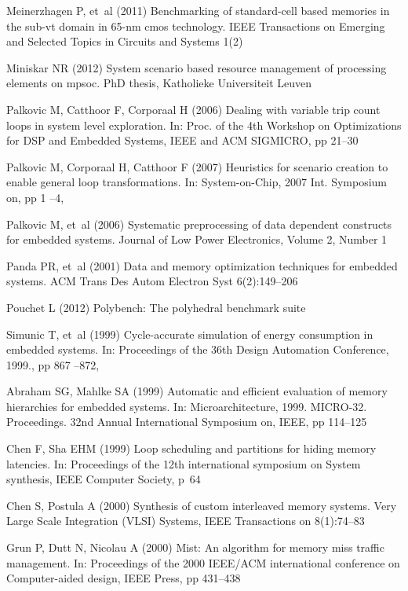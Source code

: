 \documentclass[smallcondensed]{svjour3}
\begin{document}
\begin{thebibliography}{40}
Meinerzhagen P, et~al (2011) Benchmarking of standard-cell based memories in
  the sub-vt domain in 65-nm cmos technology. IEEE Transactions on Emerging and
  Selected Topics in Circuits and Systems 1(2)

Miniskar NR (2012) System scenario based resource management of processing
  elements on mpsoc. PhD thesis, Katholieke Universiteit Leuven

Palkovic M, Catthoor F, Corporaal H (2006{}) Dealing with variable
  trip count loops in system level exploration. In: Proc. of the 4th Workshop
  on Optimizations for DSP and Embedded Systems, IEEE and ACM SIGMICRO, pp
  21--30

Palkovic M, Corporaal H, Catthoor F (2007) Heuristics for scenario creation to
  enable general loop transformations. In: System-on-Chip, 2007 Int. Symposium
  on, pp 1 --4, 

Palkovic M, et~al (2006{}) Systematic preprocessing of data
  dependent constructs for embedded systems. Journal of Low Power Electronics,
  Volume 2, Number 1

Panda PR, et~al (2001) Data and memory optimization techniques for embedded
  systems. ACM Trans Des Autom Electron Syst 6(2):149--206

Pouchet L (2012) Polybench: The polyhedral benchmark suite

Simunic T, et~al (1999) Cycle-accurate simulation of energy consumption in
  embedded systems. In: Proceedings of the 36th Design Automation Conference,
  1999., pp 867 --872, 
  
Abraham SG, Mahlke SA (1999) Automatic and efficient evaluation of memory
  hierarchies for embedded systems. In: Microarchitecture, 1999. MICRO-32.
  Proceedings. 32nd Annual International Symposium on, IEEE, pp 114--125

Chen F, Sha EHM (1999) Loop scheduling and partitions for hiding memory
  latencies. In: Proceedings of the 12th international symposium on System
  synthesis, IEEE Computer Society, p~64

Chen S, Postula A (2000) Synthesis of custom interleaved memory systems. Very
  Large Scale Integration (VLSI) Systems, IEEE Transactions on 8(1):74--83

Grun P, Dutt N, Nicolau A (2000) Mist: An algorithm for memory miss traffic
  management. In: Proceedings of the 2000 IEEE/ACM international conference on
  Computer-aided design, IEEE Press, pp 431--438


\end{thebibliography}
\end{document}
